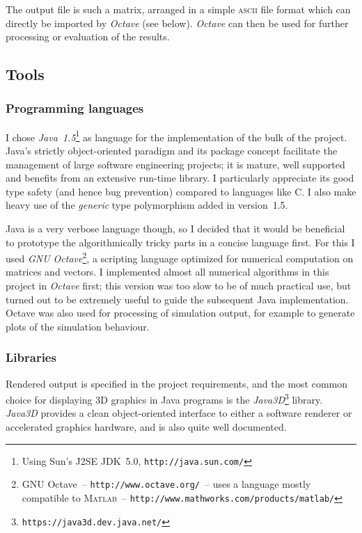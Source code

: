 The output file is such a matrix, arranged in a simple \textsc{ascii} file format which can
directly be imported by \textsl{Octave} (see below). \textsl{Octave} can then be used for further
processing or evaluation of the results.

\subsection{Tools}
\subsubsection{Programming languages}
I chose \textsl{Java~1.5}\footnote{Using Sun's J2SE JDK~5.0, \texttt{http://java.sun.com/}}
as language for the implementation of the bulk of the project. Java's strictly object-oriented
paradigm and its package concept facilitate the management of large software engineering
projects; it is mature, well supported and benefits from an extensive run-time library. I
particularly appreciate its good type safety (and hence bug prevention) compared to languages
like C. I also make heavy use of the \emph{generic} type polymorphism added in version~1.5.

Java is a very verbose language though, so I decided that it would be beneficial to prototype
the algorithmically tricky parts in a concise language first. For this I used
\textsl{GNU Octave}\footnote{GNU Octave~-- \texttt{http://www.octave.org/}~-- uses a language
mostly compatible to \textsc{Matlab}~-- \texttt{http://www.mathworks.com/products/matlab/}},
a scripting language optimized for numerical computation on matrices and vectors. I implemented
almost all numerical algorithms in this project in \textsl{Octave} first; this version was too
slow to be of much practical use, but turned out to be extremely useful to guide the subsequent
Java implementation. Octave was also used for processing of simulation output, for example to
generate plots of the simulation behaviour.

\subsubsection{Libraries}
Rendered output is specified in the project requirements, and the most common choice for
displaying 3D graphics in Java programs is the
\textsl{Java3D}\footnote{\texttt{https://java3d.dev.java.net/}} library. \textsl{Java3D} provides
a clean object-oriented interface to either a software renderer or accelerated graphics hardware,
and is also quite well documented.

